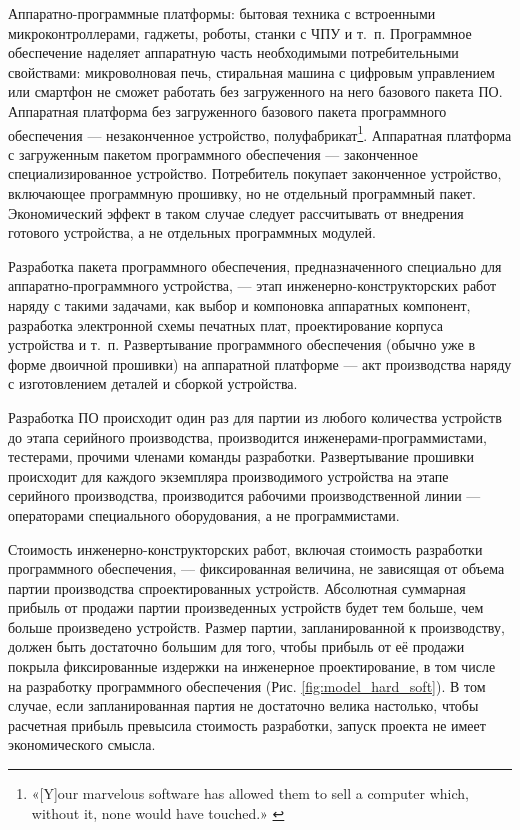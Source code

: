 \documentclass{article}
\begin{document}
Аппаратно-программные платформы: бытовая техника с встроенными микроконтроллерами, гаджеты, роботы, станки с ЧПУ и т.~п. Программное обеспечение наделяет аппаратную часть необходимыми потребительными свойствами: микроволновая печь, стиральная машина с цифровым управлением или смартфон не сможет работать без загруженного на него базового пакета ПО. Аппаратная платформа без загруженного базового пакета программного обеспечения — незаконченное устройство, полуфабрикат\footnote{«[Y]our marvelous software has allowed them to sell a computer which, without it, none would have touched.» \cite{driscollOpenLetter}}. Аппаратная платформа с загруженным пакетом программного обеспечения — законченное специализированное устройство. Потребитель покупает законченное устройство, включающее программную прошивку, но не отдельный программный пакет. Экономический эффект в таком случае следует рассчитывать от внедрения готового устройства, а не отдельных программных модулей.

Разработка пакета программного обеспечения, предназначенного специально для аппаратно-программного устройства, — этап инженерно-конструкторских работ наряду с такими задачами, как выбор и компоновка аппаратных компонент, разработка электронной схемы печатных плат, проектирование корпуса устройства и т.~п. Развертывание программного обеспечения (обычно уже в форме двоичной прошивки) на аппаратной платформе — акт производства наряду с изготовлением деталей и сборкой устройства. 

Разработка ПО происходит один раз для партии из любого количества устройств до этапа серийного производства, производится инженерами-программистами, тестерами, прочими членами команды разработки. Развертывание прошивки происходит для каждого экземпляра производимого устройства на этапе серийного производства, производится рабочими производственной линии — операторами специального оборудования, а не программистами.

Стоимость инженерно-конструкторских работ, включая стоимость разработки программного обеспечения, — фиксированная величина, не зависящая от объема партии производства спроектированных устройств. Абсолютная суммарная прибыль от продажи партии произведенных устройств будет тем больше, чем больше произведено устройств. Размер партии, запланированной к производству, должен быть достаточно большим для того, чтобы прибыль от её продажи покрыла фиксированные издержки на инженерное проектирование, в том числе на разработку программного обеспечения (Рис. \ref{fig:model_hard_soft}). В том случае, если запланированная партия не достаточно велика настолько, чтобы расчетная прибыль превысила стоимость разработки, запуск проекта не имеет экономического смысла.
\end{document}
